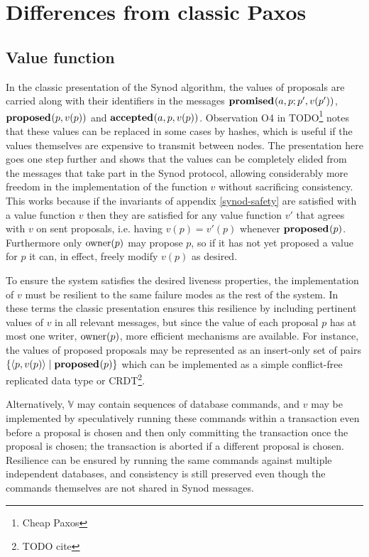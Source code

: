 \documentclass[journal]{IEEEtran}
\begin{document}
\section{Differences from classic Paxos} \label{deviations-from-classic}

\subsection{Value function}

In the classic presentation of the Synod algorithm, the values of proposals are
carried along with their identifiers in the messages $\mathbf{promised}_{}(a,p; p',v(p')
)$, $\mathbf{proposed}_{}( p,v(p))$ and $\mathbf{accepted}_{}(a, p,v(p) )$. Observation O4 in
TODO\footnote{Cheap Paxos} notes that these values can be replaced in some
cases by hashes, which is useful if the values themselves are expensive to
transmit between nodes. The presentation here goes one step further and shows
that the values can be completely elided from the messages that take part in
the Synod protocol, allowing considerably more freedom in the implementation of
the function $v$ without sacrificing consistency.  This works because if the
invariants of appendix \ref{synod-safety} are satisfied with a value function
$v$ then they are satisfied for any value function $v'$ that agrees with $v$ on
sent proposals, i.e. having $v(p) = v'(p)$ whenever $\mathbf{proposed}_{}(p)$.  Furthermore
only $\mathrm{owner}(p)$ may propose $p$, so if it has not yet proposed a value for $p$
it can, in effect, freely modify $v(p)$ as desired.

To ensure the system satisfies the desired liveness properties, the
implementation of $v$ must be resilient to the same failure modes as the rest
of the system. In these terms the classic presentation ensures this resilience
by including pertinent values of $v$ in all relevant messages, but since the
value of each proposal $p$ has at most one writer, $\mathrm{owner}(p)$, more efficient
mechanisms are available. For instance, the values of proposed proposals may be
represented as an insert-only set of pairs $\{ \langle p, v(p) \rangle \mid
\mathbf{proposed}_{}(p) \}$ which can be implemented as a simple conflict-free replicated
data type or CRDT\footnote{TODO cite}.

Alternatively, $\mathbb V$ may contain sequences of database commands, and $v$
may be implemented by speculatively running these commands within a transaction
even before a proposal is chosen and then only committing the transaction once
the proposal is chosen; the transaction is aborted if a different proposal is
chosen. Resilience can be ensured by running the same commands against multiple
independent databases, and consistency is still preserved even though the
commands themselves are not shared in Synod messages.
\end{document}
